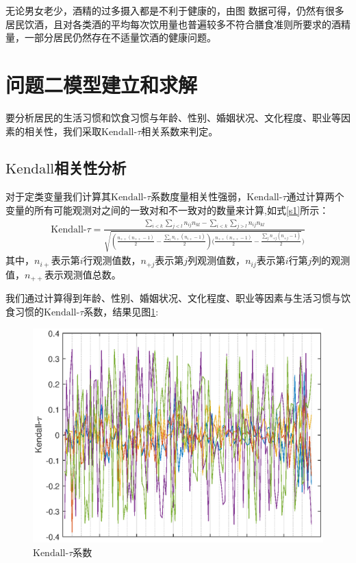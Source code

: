 \documentclass{cumcmthesis}
\begin{document}



无论男女老少，酒精的过多摄入都是不利于健康的，由图  数据可得，仍然有很多居民饮酒，且对各类酒的平均每次饮用量也普遍较多不符合膳食准则所要求的酒精量，一部分居民仍然存在不适量饮酒的健康问题。
\clearpage
\section{问题二模型建立和求解}
要分析居民的生活习惯和饮食习惯与年龄、性别、婚姻状况、文化程度、职业等因素的相关性，我们采取$\text{Kendall-}\tau$相关系数来判定。
\subsection{$\text{Kendall}$相关性分析}
对于定类变量我们计算其$\text{Kendall-}\tau$系数度量相关性强弱，$\text{Kendall-}\tau$通过计算两个变量的所有可能观测对之间的一致对和不一致对的数量来计算,如式\ref{s1}所示：
\begin{eqnarray}
\text{Kendall-}\tau=\frac{\sum_{i<k}\sum_{j<l}n_{ij}n_{kl}-\sum_{i<k}\sum_{j>l}n_{ij}n_{kl}}{\sqrt{(\frac{n_{++}(n_{++}-1)}{2}-\frac{\sum_in_{i+}(n_{i+}-1)}{2})(\frac{n_{++}(n_{++}-1)}{2}-\frac{\sum_jn_{+j}(n_{+j}-1)}{2}})}\label{s1}
\end{eqnarray}
其中，$n_{i+}$表示第$i$行观测值数，$n_{+j}$表示第$j$列观测值数，$n_{ij}$表示第$i$行第$j$列的观测值，$n_{++}$表示观测值总数。

我们通过计算得到年龄、性别、婚姻状况、文化程度、职业等因素与生活习惯与饮食习惯的$\text{Kendall-}\tau$系数，结果见图\ref{2}:
\begin{figure}[H]
\centering
\includegraphics{figures/A2.eps}
\caption{$\text{Kendall-}\tau$系数}\label{2}
\end{figure}
\end{document}
